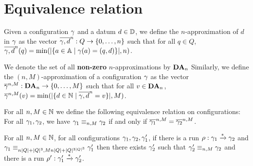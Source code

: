 \section{Equivalence relation}
\label{sec:equivalence-relation}

Given a configuration $\config$ and a datum $d \in \Dataset$, we define the $n$-approximation of $d$ in $\config$ as the vector $\dataapprox{n}{\config}{d} : Q \to \nset{0}{n}$ such that for all $q\in Q$, $\dataapprox{n}{\config}{d}(q)=\min(\size{\set{a \in \Agentset \mid \config(a)= (q,d)}},n)$.

We denote the set of all \textbf{non-zero} $n$-approximations by $\DataApproxSet{n}$
Similarly, we define the $(n,M)$-approximation of a configuration $\config$ as the vector $\configapprox{n}{M}{\config} : \DataApproxSet{n} \to \nset{0}{M}$ such that for all $v\in \DataApproxSet{n}$,
$\configapprox{n}{M}{\config}(v) = \min(\size{\set{d \in \nats \mid \dataapprox{n}{\config}{d} = v}},M)$.


For all $n, M \in \nats$ we define the following equivalence relation on configurations: 
For all $\config_1, \config_2$, we have $\config_1 \equiv_{n,M} \config_2$ if and only if $\configapprox{n}{M}{\config_1} = \configapprox{n}{M}{\config_2}$.



\begin{lemma}
	For all $n, M \in \nats$, for all configurations $\config_1, \config_2, \config_1'$, if there is a run $\run : \config_1 \xrightarrow{*} \config_2$ and $\config_1 \equiv_{n\size{Q}+\size{Q}^3,Mn\size{Q}+\size{Q}^{3\size{Q}^3}} \config'_1$ then there exists $\config'_2$ such that $\config'_2 \equiv_{n,M} \config_2$ and there is a run $\run' : \config_1' \xrightarrow{*} \config_2'$.
\end{lemma}
